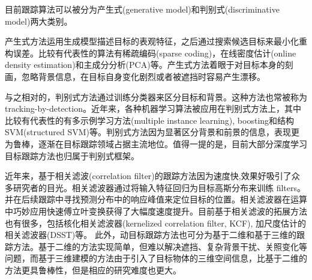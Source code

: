 目前跟踪算法可以被分为产生式(generative model)和判别式(discriminative model)两大类别。

产生式方法运用生成模型描述目标的表观特征，之后通过搜索候选目标来最小化重构误差。比较有代表性的算法有稀疏编码(sparse coding)，在线密度估计(online density estimation)和主成分分析(PCA)等。产生式方法着眼于对目标本身的刻画，忽略背景信息，在目标自身变化剧烈或者被遮挡时容易产生漂移。

与之相对的，判别式方法通过训练分类器来区分目标和背景。这种方法也常被称为tracking-by-detection。近年来，各种机器学习算法被应用在判别式方法上，其中比较有代表性的有多示例学习方法(multiple instance learning), boosting和结构SVM(structured SVM)等。判别式方法因为显著区分背景和前景的信息，表现更为鲁棒，逐渐在目标跟踪领域占据主流地位。值得一提的是，目前大部分深度学习目标跟踪方法也归属于判别式框架。

近年来，基于相关滤波(correlation filter)的跟踪方法因为速度快,效果好吸引了众多研究者的目光。相关滤波器通过将输入特征回归为目标高斯分布来训练 filters。并在后续跟踪中寻找预测分布中的响应峰值来定位目标的位置。相关滤波器在运算中巧妙应用快速傅立叶变换获得了大幅度速度提升。目前基于相关滤波的拓展方法也有很多，包括核化相关滤波器(kernelized correlation filter, KCF), 加尺度估计的相关滤波器(DSST)等。
此外，动目标跟踪方法也可分为基于二维和基于三维的跟踪方法。基于二维的方法实现简单，但难以解决遮挡、复杂背景干扰、关照变化等问题，而基于三维建模的方法由于引入了目标物体的三维空间信息，比基于二维的方法更具鲁棒性，但是相应的研究难度也更大。
